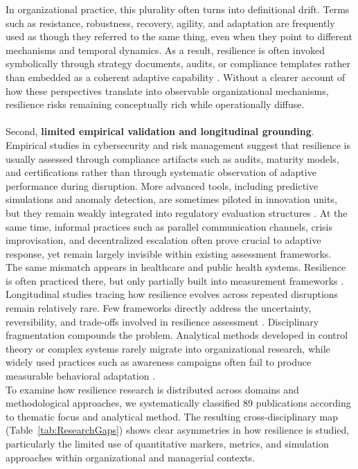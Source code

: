 In organizational practice, this plurality often turns into definitional drift. Terms such as resistance, robustness, recovery, agility, and adaptation are frequently used as though they referred to the same thing, even when they point to different mechanisms and temporal dynamics. As a result, resilience is often invoked symbolically through strategy documents, audits, or compliance templates rather than embedded as a coherent adaptive capability \autocite{duchek2020organizational}. Without a clearer account of how these perspectives translate into observable organizational mechanisms, resilience risks remaining conceptually rich while operationally diffuse.\\
\\
Second, \textbf{limited empirical validation and longitudinal grounding}. Empirical studies in cybersecurity and risk management suggest that resilience is usually assessed through compliance artifacts such as audits, maturity models, and certifications rather than through systematic observation of adaptive performance during disruption. More advanced tools, including predictive simulations and anomaly detection, are sometimes piloted in innovation units, but they remain weakly integrated into regulatory evaluation structures \autocite{skopik2016problem}. At the same time, informal practices such as parallel communication channels, crisis improvisation, and decentralized escalation often prove crucial to adaptive response, yet remain largely invisible within existing assessment frameworks.\\

The same mismatch appears in healthcare and public health systems. Resilience is often practiced there, but only partially built into measurement frameworks \autocite{kruk2017building}. Longitudinal studies tracing how resilience evolves across repeated disruptions remain relatively rare. Few frameworks directly address the uncertainty, reversibility, and trade-offs involved in resilience assessment \autocite{allen2018quantifying}. Disciplinary fragmentation compounds the problem. Analytical methods developed in control theory or complex systems rarely migrate into organizational research, while widely used practices such as awareness campaigns often fail to produce measurable behavioral adaptation \autocite{bada2019cyber}.
\\
To examine how resilience research is distributed across domains and methodological approaches, we systematically classified 89 publications according to thematic focus and analytical method. The resulting cross-disciplinary map (Table~\ref{tab:ResearchGaps}) shows clear asymmetries in how resilience is studied, particularly the limited use of quantitative markers, metrics, and simulation approaches within organizational and managerial contexts.\\
\\


